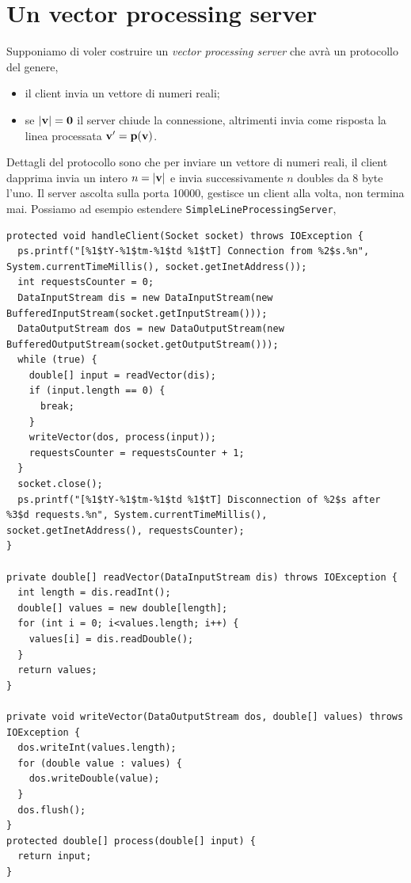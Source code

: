 \documentclass[\fontsizeclass,twocolumn]{\classname}
\theoremstyle{definition}
\theoremstyle{definition}
\begin{document}
\section{Un vector processing server}

Supponiamo di voler costruire un \emph{vector processing server} che avrà un
protocollo del genere,
\begin{itemize}
    \item il client invia un vettore di numeri reali;
    \item se $|\bf{v}| = \bf{0}$ il server chiude la connessione, altrimenti
        invia come risposta la linea processata $\bf{v}^\prime = p(\bf v)$.
\end{itemize}

Dettagli del protocollo sono che per inviare un vettore di numeri reali, il
client dapprima invia un intero $n = |\bf v|$ e invia successivamente $n$
doubles da 8 byte l'uno. Il server ascolta sulla porta 10000, gestisce un
client alla volta, non termina mai. Possiamo ad esempio estendere
\texttt{SimpleLineProcessingServer},

\begin{lstlisting}
protected void handleClient(Socket socket) throws IOException {
  ps.printf("[%1$tY-%1$tm-%1$td %1$tT] Connection from %2$s.%n", System.currentTimeMillis(), socket.getInetAddress());
  int requestsCounter = 0;
  DataInputStream dis = new DataInputStream(new BufferedInputStream(socket.getInputStream()));
  DataOutputStream dos = new DataOutputStream(new BufferedOutputStream(socket.getOutputStream()));
  while (true) {
    double[] input = readVector(dis);
    if (input.length == 0) {
      break;
    }
    writeVector(dos, process(input));
    requestsCounter = requestsCounter + 1;
  }
  socket.close();
  ps.printf("[%1$tY-%1$tm-%1$td %1$tT] Disconnection of %2$s after %3$d requests.%n", System.currentTimeMillis(), socket.getInetAddress(), requestsCounter);
}

private double[] readVector(DataInputStream dis) throws IOException {
  int length = dis.readInt();
  double[] values = new double[length];
  for (int i = 0; i<values.length; i++) {
    values[i] = dis.readDouble();
  }
  return values;
}

private void writeVector(DataOutputStream dos, double[] values) throws IOException {
  dos.writeInt(values.length);
  for (double value : values) {
    dos.writeDouble(value);
  }
  dos.flush();
}
protected double[] process(double[] input) {
  return input;
}
\end{lstlisting}
\end{document}
